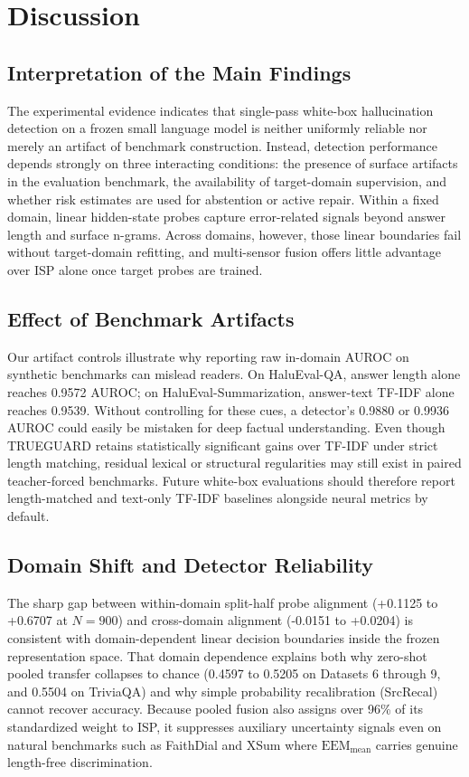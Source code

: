 \documentclass{ieeeaccess}
\begin{document}
\section{Discussion}
\label{sec:discussion}

\subsection{Interpretation of the Main Findings}
The experimental evidence indicates that single-pass white-box hallucination detection on a frozen small language model is neither uniformly reliable nor merely an artifact of benchmark construction. Instead, detection performance depends strongly on three interacting conditions: the presence of surface artifacts in the evaluation benchmark, the availability of target-domain supervision, and whether risk estimates are used for abstention or active repair. Within a fixed domain, linear hidden-state probes capture error-related signals beyond answer length and surface n-grams. Across domains, however, those linear boundaries fail without target-domain refitting, and multi-sensor fusion offers little advantage over ISP alone once target probes are trained.

\subsection{Effect of Benchmark Artifacts}
Our artifact controls illustrate why reporting raw in-domain AUROC on synthetic benchmarks can mislead readers. On HaluEval-QA, answer length alone reaches 0.9572 AUROC; on HaluEval-Summarization, answer-text TF-IDF alone reaches 0.9539. Without controlling for these cues, a detector's 0.9880 or 0.9936 AUROC could easily be mistaken for deep factual understanding. Even though TRUEGUARD retains statistically significant gains over TF-IDF under strict length matching, residual lexical or structural regularities may still exist in paired teacher-forced benchmarks. Future white-box evaluations should therefore report length-matched and text-only TF-IDF baselines alongside neural metrics by default.

\subsection{Domain Shift and Detector Reliability}
The sharp gap between within-domain split-half probe alignment (+0.1125 to +0.6707 at $N = 900$) and cross-domain alignment (-0.0151 to +0.0204) is consistent with domain-dependent linear decision boundaries inside the frozen representation space. That domain dependence explains both why zero-shot pooled transfer collapses to chance (0.4597 to 0.5205 on Datasets 6 through 9, and 0.5504 on TriviaQA) and why simple probability recalibration (SrcRecal) cannot recover accuracy. Because pooled fusion also assigns over 96\% of its standardized weight to ISP, it suppresses auxiliary uncertainty signals even on natural benchmarks such as FaithDial and XSum where $\text{EEM}_{\text{mean}}$ carries genuine length-free discrimination.
\end{document}
